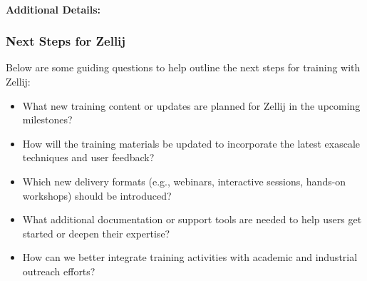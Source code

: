 \paragraph{Additional Details:}


\subsubsection{Next Steps for Zellij}
\label{sec:Zellij:next-steps}

Below are some guiding questions to help outline the next steps for training with Zellij:
\begin{itemize}
    \item What new training content or updates are planned for Zellij in the upcoming milestones?
    \item How will the training materials be updated to incorporate the latest exascale techniques and user feedback?
    \item Which new delivery formats (e.g., webinars, interactive sessions, hands-on workshops) should be introduced?
    \item What additional documentation or support tools are needed to help users get started or deepen their expertise?
    \item How can we better integrate training activities with academic and industrial outreach efforts?
\end{itemize}